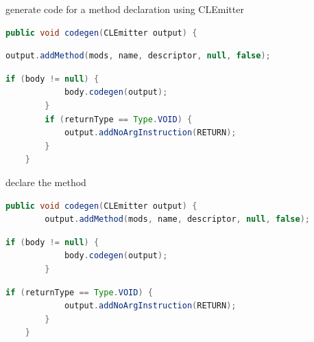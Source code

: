 \documentclass[8pt,a4paper,compress]{beamer}
\begin{document}
\begin{frame}[fragile]
\begin{overprint}
\begin{tcolorbox}[enhanced,drop shadow southwest,sharp corners,size=fbox,colback=white,fontlower=\small\ttfamily,collower=silver900]
\tcblower
\begin{minipage}[t][.2cm][t]{\textwidth}
generate code for a method declaration using CLEmitter
\end{minipage}
\end{tcolorbox}

\begin{tcolorbox}[enhanced,drop shadow southwest,sharp corners,size=fbox,colback=white,fontlower=\small\ttfamily,collower=silver900]

\begin{lstlisting}[language=Java,style=focusout]
    public void codegen(CLEmitter output) {
\end{lstlisting}
\begin{lstlisting}[language=Java,style=focusin,backgroundcolor=\color{lime100}]
        output.addMethod(mods, name, descriptor, null, false);
\end{lstlisting}
\begin{lstlisting}[language=Java,style=focusout]
        if (body != null) {
            body.codegen(output);
        }
        if (returnType == Type.VOID) {
            output.addNoArgInstruction(RETURN);
        }
    }
\end{lstlisting}

\tcblower
\begin{minipage}[t][.2cm][t]{\textwidth}
declare the method
\end{minipage}
\end{tcolorbox}

\begin{tcolorbox}[enhanced,drop shadow southwest,sharp corners,size=fbox,colback=white,fontlower=\small\ttfamily,collower=silver900]

\begin{lstlisting}[language=Java,style=focusout]
    public void codegen(CLEmitter output) {
        output.addMethod(mods, name, descriptor, null, false);
\end{lstlisting}
\begin{lstlisting}[language=Java,style=focusin,backgroundcolor=\color{lime100}]
        if (body != null) {
            body.codegen(output);
        }
\end{lstlisting}
\begin{lstlisting}[language=Java,style=focusout]
        if (returnType == Type.VOID) {
            output.addNoArgInstruction(RETURN);
        }
    }
\end{lstlisting}


\end{tcolorbox}
\end{overprint}
\end{frame}
\end{document}
